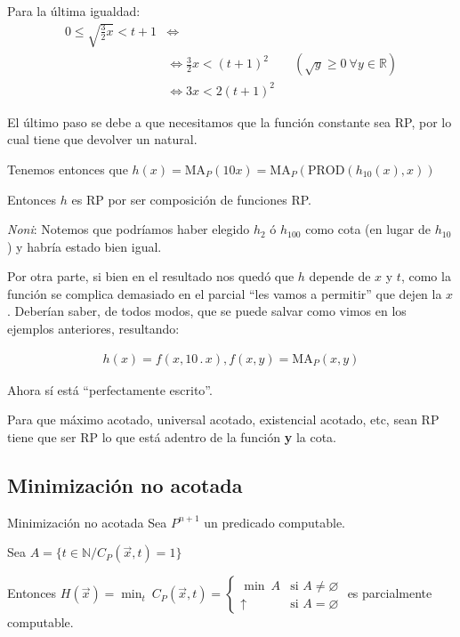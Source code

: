 \begin{tcolorbox}[%
    colback=white,%
    colbacktitle=black!75!white,%
    colframe=black!25!white,%
    title=Cuenta auxiliar%
    ]

Para la última igualdad:
\begin{align*}
    0 \leq \sqrt{\frac{3}{2} x} < t + 1 &\iff \\
    &\iff \frac{3}{2} x < (t+1)^2 \qquad 
    (\sqrt{y} \geq 0 ~ \forall y \in \mathbb{R}) \\
    &\iff 3x < 2 (t+1)^2 \qquad \qquad
\end{align*}

El último paso se debe a que necesitamos que la función constante sea RP,
por lo cual tiene que devolver un natural.
\end{tcolorbox}

\medskip

Tenemos entonces que $h(x) = \mathrm{MA}_P (10 x)
= \mathrm{MA}_P (\mathrm{PROD}(h_{10}(x), x))$


Entonces $h$ es RP por ser composición de funciones RP.

\textit{Noni}: Notemos que podríamos haber elegido $h_2$ ó $h_{100}$ como cota (en lugar
de $h_{10}$) y habría estado bien igual.

Por otra parte, si bien en el resultado nos quedó que $h$ depende de $x$ y $t$,
como la función se complica demasiado en el parcial ``les vamos a permitir''
que dejen la $x$. Deberían saber, de todos modos, que se puede salvar como
vimos en los ejemplos anteriores, resultando:

\begin{gather*}
    h(x) = f(x,10 \, . \, x), f(x,y) = \mathrm{MA}_P(x,y)
\end{gather*}

Ahora sí está ``perfectamente escrito''.

Para que máximo acotado, universal acotado, existencial acotado, etc, sean RP
tiene que ser RP lo que está adentro de la función \textbf{y} la cota.


\subsection{Minimización no acotada}

\begin{teorema}{Minimización no acotada}{}
    Sea $P^{n+1}$ un predicado computable.

    Sea $A = \{ t \in \mathbb{N}/ C_P(\overrightarrow{x},t)=1 \}$

    \medskip

    Entonces $H(\vec{x}) = \min_{t}{~ C_P(\overrightarrow{x},t)} = 
    \begin{cases}
        \min{~ A} & \text{si } A \neq \varnothing \\
        \uparrow & \text{si } A = \varnothing
    \end{cases}$
    es parcialmente computable.
\end{teorema}

